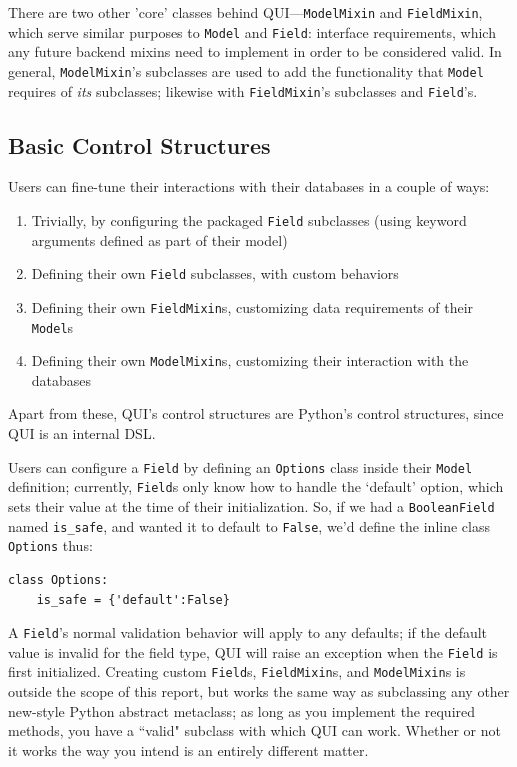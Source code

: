 \documentclass{article} %
\newenvironment{inset}
{
\begin{center}
\begin{minipage}{0.85\textwidth}
}
{
\end{minipage}
\end{center}
}
\newcommand{\il}[1]{\mbox{\lstinline{#1}}}
\begin{document}
There are two other 'core' classes behind QUI---\il{ModelMixin} and \il{FieldMixin}, which serve similar purposes to \il{Model} and \il{Field}: interface
 requirements, which any future backend mixins need to implement in order to be considered valid. In general, \il{ModelMixin}'s subclasses are used
to add the functionality that \il{Model} requires of \emph{its} subclasses; likewise with \il{FieldMixin}'s subclasses and \il{Field}'s.

\subsection{Basic Control Structures}
Users can fine-tune their interactions with their databases in a couple of ways:
\begin{enumerate}
\item Trivially, by configuring the packaged \il{Field} subclasses (using keyword arguments defined as part of their model)
\item Defining their own \il{Field} subclasses, with custom behaviors
\item Defining their own \il{FieldMixin}s, customizing data requirements of their \il{Model}s
\item Defining their own \il{ModelMixin}s, customizing their interaction with the databases
\end{enumerate}
Apart from these, QUI's control structures are Python's control structures, since QUI is an internal DSL.

Users can configure a \il{Field} by defining an \il{Options} class inside their \il{Model} definition; currently, \il{Field}s only know how to handle the
`default' option, which sets their value at the time of their initialization. So, if we had a \il{BooleanField} named \il{is_safe}, and wanted it to default to
\il{False}, we'd define the inline class \il{Options} thus:
\begin{inset}
\begin{lstlisting}
class Options:
    is_safe = {'default':False}
\end{lstlisting}
\end{inset}
A \il{Field}'s normal validation behavior will apply to any defaults; if the default value is invalid for the field type, QUI will raise an exception when the \il{Field} is first
initialized. 
Creating custom \il{Field}s, \il{FieldMixin}s, and \il{ModelMixin}s is outside the scope of this report,
but works the same way as subclassing any other new-style Python abstract metaclass; as long as you implement the required methods, you have a ``valid"
subclass with which QUI can work. Whether or not it works the way you intend is an entirely different matter.
\end{document}
